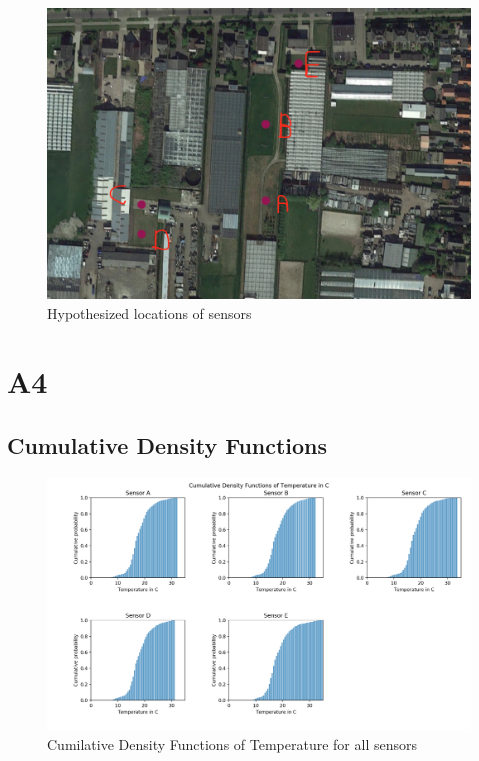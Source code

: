 \documentclass{article}
\begin{document}
        \begin{figure}[H]
            \includegraphics[width=\textwidth]{hypo_locations.png}
            \caption{Hypothesized locations of sensors}
        \end{figure}

\section{A4}
    \subsection{Cumulative Density Functions}
        \begin{figure}[H]
            \includegraphics[width=\textwidth]{cdf_temp}
            \caption{Cumilative Density Functions of Temperature for all sensors}
        \end{figure}
\end{document}
